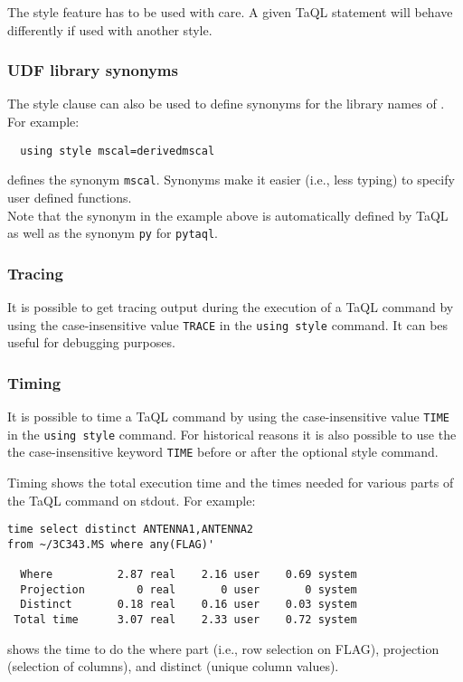 The style feature has to be used with care. A given TaQL statement will
behave differently if used with another style.

\subsubsection{UDF library synonyms}
The style clause can also be used to define synonyms for the
library names of . For example:
\begin{verbatim}
  using style mscal=derivedmscal
\end{verbatim}
defines the synonym \texttt{mscal}. Synonyms make it
easier (i.e., less typing) to specify user defined functions.
\\Note that the synonym in the example above is automatically defined
by TaQL as well as the synonym \texttt{py} for \texttt{pytaql}.

\subsubsection{Tracing}
It is possible to get tracing output during the execution of a TaQL
command by using the case-insensitive value \texttt{TRACE} in the
\texttt{using style} command. It can bes useful for debugging purposes.

\subsubsection{Timing}
It is possible to time a TaQL command by using the case-insensitive
value \texttt{TIME} in the \texttt{using style} command. 
For historical reasons it is also possible to use the the case-insensitive
keyword \texttt{TIME} before or after the optional style command.

Timing shows the total execution time and the times needed for various parts of the
TaQL command on stdout. For example:
\begin{verbatim}
time select distinct ANTENNA1,ANTENNA2
from ~/3C343.MS where any(FLAG)'

  Where          2.87 real    2.16 user    0.69 system
  Projection        0 real       0 user       0 system
  Distinct       0.18 real    0.16 user    0.03 system
 Total time      3.07 real    2.33 user    0.72 system
\end{verbatim}
shows the time to do the where part (i.e., row selection on FLAG),
projection (selection of columns), and distinct (unique column values).

